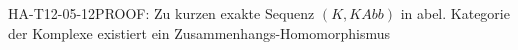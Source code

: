 
\begin{REM}{HA-T12-05-12}{PROOF: Zu kurzen exakte Sequenz $(K,KAbb)$ in abel. Kategorie der Komplexe existiert ein Zusammenhangs-Homomorphismus}
\end{REM}

